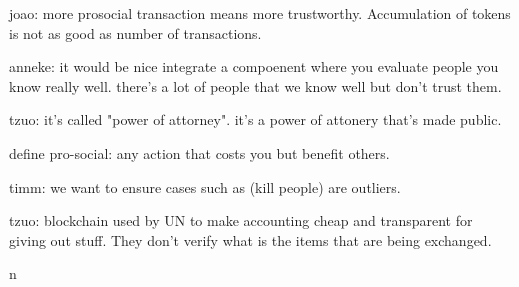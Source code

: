 joao: more prosocial transaction means more trustworthy. Accumulation of tokens is not as good as number of transactions. 

anneke: it would be nice integrate a compoenent where you evaluate people you know really well. there's a lot of people that we know well but don't trust them.

tzuo: it's called "power of attorney". it's a power of attonery that's made public. 

define pro-social: any action that costs you but benefit others.

timm: we want to ensure cases such as (kill people) are outliers.

tzuo: blockchain used by UN to make accounting cheap and transparent for giving out stuff. They don't verify what is the items that are being exchanged. 

n













